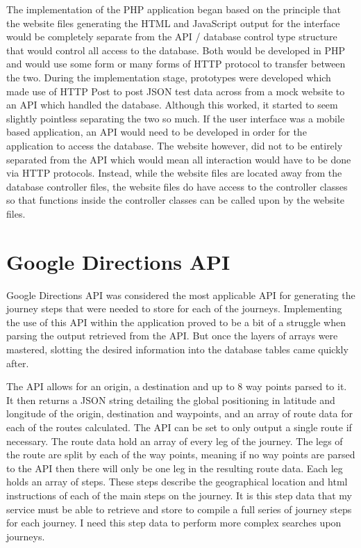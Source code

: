 	The implementation of the PHP application began based on the principle that the website files generating the HTML and JavaScript output for the interface would be completely separate from the API / database control type structure that would control all access to the database. Both would be developed in PHP and would use some form or many forms of HTTP protocol to transfer between the two. During the implementation stage, prototypes were developed which made use of HTTP Post to post JSON test data across from a mock website to an API which handled the database. Although this worked, it started to seem slightly pointless separating the two so much. If the user interface was a mobile based application, an API would need to be developed in order for the application to access the database. The website however, did not to be entirely separated from the API which would mean all interaction would have to be done via HTTP protocols. Instead, while the website files are located away from the database controller files, the website files do have access to the controller classes so that functions inside the controller classes can be called upon by the website files. 
	
\section{Google Directions API}
	Google Directions API was considered the most applicable API for generating the journey steps that were needed to store for each of the journeys. Implementing the use of this API within the application proved to be a bit of a struggle when parsing the output retrieved from the API. But once the layers of arrays were mastered, slotting the desired information into the database tables came quickly after. 
	
	The API allows for an origin, a destination and up to 8 way points parsed to it. It then returns a JSON string detailing the global positioning in latitude and longitude of the origin, destination and waypoints, and an array of route data for each of the routes calculated. The API can be set to only output a single route if necessary. The route data hold an array of every leg of the journey. The legs of the route are split by each of the way points, meaning if no way points are parsed to the API then there will only be one leg in the resulting route data. Each leg holds an array of steps. These steps describe the geographical location and html instructions of each of the main steps on the journey. It is this step data that my service must be able to retrieve and store to compile a full series of journey steps for each journey. I need this step data to perform more complex searches upon journeys.
	
